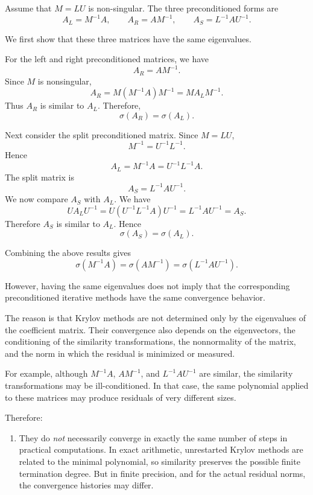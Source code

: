 \documentclass{ctexart}
\begin{document}
\begin{solution}
  Assume that \(M=LU\) is non-singular.  The three preconditioned forms are
  \[
    A_L=M^{-1}A,
    \qquad
    A_R=AM^{-1},
    \qquad
    A_S=L^{-1}AU^{-1}.
  \]

  We first show that these three matrices have the same eigenvalues.

  For the left and right preconditioned matrices, we have
  \[
    A_R=AM^{-1}.
  \]
  Since \(M\) is nonsingular,
  \[
    A_R
    =
    M(M^{-1}A)M^{-1}
    =
    M A_L M^{-1}.
  \]
  Thus \(A_R\) is similar to \(A_L\). Therefore,
  \[
    \sigma(A_R)=\sigma(A_L).
  \]

  Next consider the split preconditioned matrix. Since \(M=LU\),
  \[
    M^{-1}=U^{-1}L^{-1}.
  \]
  Hence
  \[
    A_L=M^{-1}A=U^{-1}L^{-1}A.
  \]
  The split matrix is
  \[
    A_S=L^{-1}AU^{-1}.
  \]
  We now compare \(A_S\) with \(A_L\). We have
  \[
    U A_L U^{-1}
    =
    U(U^{-1}L^{-1}A)U^{-1}
    =
    L^{-1}AU^{-1}
    =
    A_S.
  \]
  Therefore \(A_S\) is similar to \(A_L\). Hence
  \[
    \sigma(A_S)=\sigma(A_L).
  \]

  Combining the above results gives
  \[
    \boxed{
      \sigma(M^{-1}A)
      =
      \sigma(AM^{-1})
      =
      \sigma(L^{-1}AU^{-1})
    }.
  \]

  However, having the same eigenvalues does not imply that the corresponding
  preconditioned iterative methods have the same convergence behavior.

  The reason is that Krylov methods are not determined only by the eigenvalues
  of the coefficient matrix.  Their convergence also depends on the eigenvectors,
  the conditioning of the similarity transformations, the nonnormality of the
  matrix, and the norm in which the residual is minimized or measured.

  For example, although \(M^{-1}A\), \(AM^{-1}\), and \(L^{-1}AU^{-1}\) are
  similar, the similarity transformations may be ill-conditioned.  In that case,
  the same polynomial applied to these matrices may produce residuals of very
  different sizes.

  Therefore:

  \begin{enumerate}[label=(\alph*)]
    \item They do \emph{not} necessarily converge in exactly the same number
      of steps in practical computations.  In exact arithmetic, unrestarted Krylov
      methods are related to the minimal polynomial, so similarity preserves the
      possible finite termination degree.  But in finite precision, and for the
      actual residual norms, the convergence histories may differ.


\end{enumerate}
\end{solution}
\end{document}
